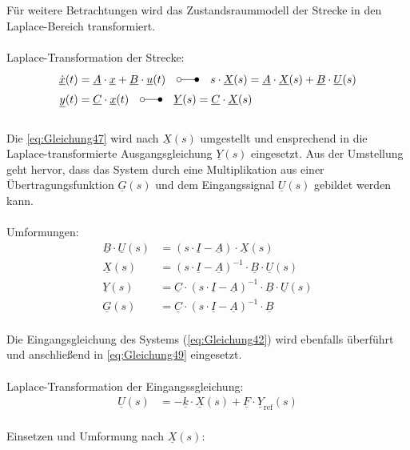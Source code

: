 \documentclass[
	pagesize,
	fontsize=12pt,
	paper=a4,
	oneside,
   reqno
]{scrartcl}
\begin{document}
Für weitere Betrachtungen wird das Zustandsraummodell der Strecke in den Laplace-Bereich transformiert.\\\\
Laplace-Transformation der Strecke:
\begin{align}
    \underline{\dot{x}}(t) &= \underline{A}\cdot\underline{x}+\underline{B}\cdot\underline{u}(t)\quad\laplace\quad s\cdot \underline{X}(s) = \underline{A}\cdot\underline{X}(s)+\underline{B}\cdot\underline{U}(s) \label{eq:Gleichung47}\\
    \underline{y}(t) &= \underline{C}\cdot\underline{x}(t) \quad\laplace\quad \underline{Y}(s) = \underline{C}\cdot\underline{X}(s) \label{eq:Gleichung48}
\end{align}\\
Die \autoref{eq:Gleichung47} wird nach $\underline{X}(s)$ umgestellt und ensprechend in die Laplace-transformierte Ausgangsgleichung $\underline{Y}(s)$ eingesetzt. Aus der Umstellung geht hervor, dass das System durch eine Multiplikation aus einer Übertragungsfunktion $\underline{G}(s)$ und dem Eingangssignal $\underline{U}(s)$ gebildet werden kann.\\\\
Umformungen:
\begin{align}
    \underline{B}\cdot\underline{U}(s) &= (s\cdot\underline{I}-\underline{A})\cdot\underline{X}(s) \label{eq:Gleichung49}\\
    \underline{X}(s) &= (s\cdot\underline{I}-\underline{A})^{-1}\cdot\underline{B}\cdot\underline{U}(s) \nonumber \\
    \underline{Y}(s) &= \underline{C}\cdot(s\cdot\underline{I}-\underline{A})^{-1}\cdot\underline{B}\cdot\underline{U}(s) \label{eq:Gleichung50}\\
    \underline{G}(s) &= \underline{C}\cdot(s\cdot\underline{I}-\underline{A})^{-1}\cdot\underline{B} \nonumber
\end{align}\\
Die Eingangsgleichung des Systems (\autoref{eq:Gleichung42}) wird ebenfalls überführt und anschließend in \autoref{eq:Gleichung49} eingesetzt.\\\\
Laplace-Transformation der Eingangssgleichung:
\begin{align*}
    \underline{U}(s) &= -\underline{k}\cdot\underline{X}(s)+\underline{F}\cdot\underline{Y}_{\mathrm{ref}}(s)
\end{align*}\\
Einsetzen und Umformung nach $\underline{X}(s)$:
\end{document}

